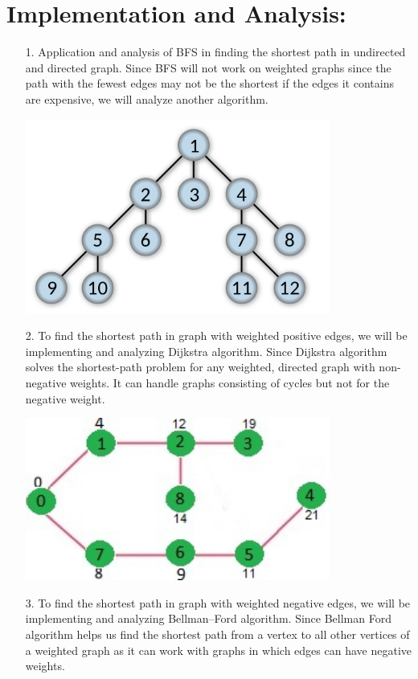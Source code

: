 \documentclass[a4paper]{article}
\begin{document}
\section{Implementation and Analysis:}

\begin{itemize}
    \item[1.] Application and analysis of BFS in finding the shortest path in undirected and directed graph. Since BFS will not work on weighted graphs since the path with the fewest edges may not be the shortest if the edges it contains are expensive, we will analyze another algorithm.
    \begin{center}
        \includegraphics[width=10cm]{images/bfs.png} 
    \end{center}
\item[2.] To find the shortest path in graph with weighted positive edges, we will be implementing and analyzing Dijkstra algorithm. Since Dijkstra algorithm solves the shortest-path problem for any weighted, directed graph with non-negative weights. It can handle graphs consisting of cycles but not for the negative weight. \begin{center}
\includegraphics[width=10cm]{images/DIJ5.jpg}
\end{center}
\item[3.] To find the shortest path in graph with weighted negative edges, we will be implementing and analyzing Bellman–Ford algorithm. Since Bellman Ford algorithm helps us find the shortest path from a vertex to all other vertices of a weighted graph as it can work with graphs in which edges can have negative weights. \begin{center}

\end{center}
\end{itemize}
\end{document}
